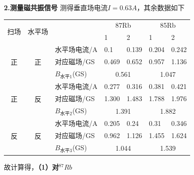 \documentclass[UTF8]{ctexart}
\begin{document}
\noindent\textbf{2.测量磁共振信号}
\newline 测得垂直场电流$I=0.63A$，其余数据如下
\begin{table}[H]
\centering
\begin{tabular}{|c|c|l|l|l|l|l|}
\hline
\multirow{2}{*}{扫场} & \multirow{2}{*}{水平场} & \multirow{2}{*}{}                                                          & \multicolumn{2}{c|}{87Rb}  & \multicolumn{2}{c|}{85Rb}  \\ \cline{4-7} 
                    &                      &                                                                            & 1            & 2           & 1            & 2           \\ \hline
\multirow{3}{*}{正}  & \multirow{3}{*}{正}   & 水平场电流/A                                                                    & 0.1          & 0.139       & 0.204        & 0.242       \\ \cline{3-7} 
                    &                      & 对应磁场/GS                                                                    & 0.469        & 0.652       & 0.957        & 1.136       \\ \cline{3-7} 
                    &                      & $B_{\mbox{水平1}}$(GS) & \multicolumn{2}{c|}{0.561} & \multicolumn{2}{c|}{1.047} \\ \hline
\multirow{3}{*}{正}  & \multirow{3}{*}{反}   & 水平场电流/A                                                                    & 0.277        & 0.316       & 0.381        & 0.421       \\ \cline{3-7} 
                    &                      & 对应磁场/GS                                                                    & 1.300        & 1.483       & 1.788        & 1.976       \\ \cline{3-7} 
                    &                      & $B_{\mbox{水平2}}$(GS) & \multicolumn{2}{c|}{1.391} & \multicolumn{2}{c|}{1.882} \\ \hline
\multirow{3}{*}{反}  & \multirow{3}{*}{反}   & 水平场电流/A                                                                    & 0.205        & 0.24        & 0.31         & 0.346       \\ \cline{3-7} 
                    &                      & 对应磁场/GS                                                                    & 0.962        & 1.126       & 1.455        & 1.624       \\ \cline{3-7} 
                    &                      & $B_{\mbox{水平3}}$(GS) & \multicolumn{2}{c|}{1.044} & \multicolumn{2}{c|}{1.539} \\ \hline
\end{tabular}
\end{table}
故计算得，\textbf{（1）对$^{87}Rb$}
\end{document}
